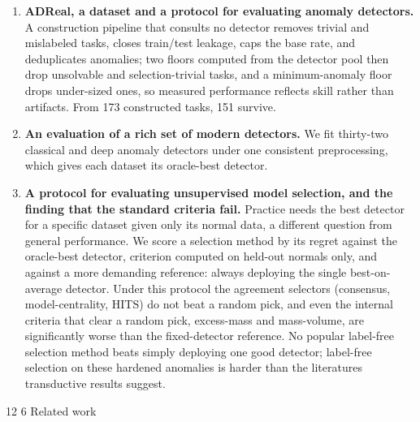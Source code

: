\documentclass[3p,twocolumn]{elsarticle}
\makeatletter
\renewcommand\section{\@startsection{section}{1}{\z@}%
           {12\p@ \@plus 4\p@ \@minus 4\p@}%
           {6\p@ \@plus 4\p@ \@minus 3\p@}%
           {\normalsize\bfseries\boldmath}}
\makeatother
\begin{document}
\begin{enumerate}
\tightlist
\item
  \textbf{ADReal, a dataset and a protocol for evaluating anomaly detectors.} A construction pipeline that consults no detector removes trivial and mislabeled tasks, closes train/test leakage, caps the base rate, and deduplicates anomalies; two floors computed from the detector pool then drop unsolvable and selection-trivial tasks, and a minimum-anomaly floor drops under-sized ones, so measured performance reflects skill rather than artifacts. From 173 constructed tasks, 151 survive.
\item
  \textbf{An evaluation of a rich set of modern detectors.} We fit thirty-two classical and deep anomaly detectors under one consistent preprocessing, which gives each dataset its oracle-best detector.
\item
  \textbf{A protocol for evaluating unsupervised model selection, and the finding that the standard criteria fail.} Practice needs the best detector for a specific dataset given only its normal data, a different question from general performance. We score a selection method by its regret against the oracle-best detector, criterion computed on held-out normals only, and against a more demanding reference: always deploying the single best-on-average detector. Under this protocol the agreement selectors (consensus, model-centrality, HITS) do not beat a random pick, and even the internal criteria that clear a random pick, excess-mass and mass-volume, are significantly worse than the fixed-detector reference. No popular label-free selection method beats simply deploying one good detector; label-free selection on these hardened anomalies is harder than the literature\textquotesingle s transductive results suggest.
\end{enumerate}

\section{Related work}\label{2-related-work}
\end{document}
